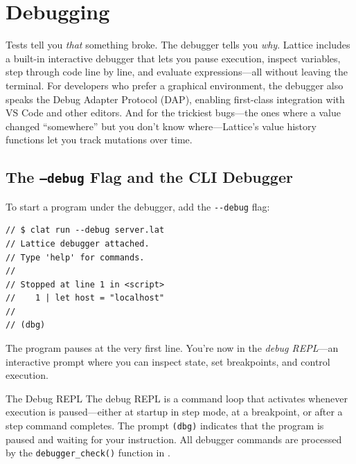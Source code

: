 \chapter{Debugging}\label{ch:debugging}


Tests tell you \emph{that} something broke.
The debugger tells you \emph{why}.
Lattice includes a built-in interactive debugger that lets you pause execution, inspect variables, step through code line by line, and evaluate expressions---all without leaving the terminal.
For developers who prefer a graphical environment, the debugger also speaks the Debug Adapter Protocol (DAP), enabling first-class integration with VS Code and other editors.
And for the trickiest bugs---the ones where a value changed ``somewhere'' but you don't know where---Lattice's value history functions let you track mutations over time.

\section{The \texttt{--debug} Flag and the CLI Debugger}\label{sec:debug-flag}

To start a program under the debugger, add the \lstinline|--debug| flag:

\begin{lstlisting}[language=Lattice, caption={Launching the debugger}]
// $ clat run --debug server.lat
// Lattice debugger attached.
// Type 'help' for commands.
//
// Stopped at line 1 in <script>
//    1 | let host = "localhost"
//
// (dbg)
\end{lstlisting}

The program pauses at the very first line.
You're now in the \emph{debug REPL}---an interactive prompt where you can inspect state, set breakpoints, and control execution.

\begin{defnbox}{The Debug REPL}
The debug REPL is a command loop that activates whenever execution is paused---either at startup in step mode, at a breakpoint, or after a step command completes.
The prompt \lstinline|(dbg)| indicates that the program is paused and waiting for your instruction.
All debugger commands are processed by the \lstinline|debugger_check()| function in .
\end{defnbox}

